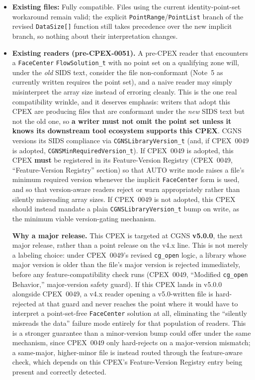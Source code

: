 \documentclass[11pt,letterpaper]{article}
\begin{document}
\begin{itemize}[leftmargin=2em]
\item \textbf{Existing files:} Fully compatible. Files using the current
  identity-point-set workaround remain valid; the explicit
  \texttt{PointRange}/\texttt{PointList} branch of the revised
  \texttt{DataSize[]} function still takes precedence over the new
  implicit branch, so nothing about their interpretation changes.

\item \textbf{Existing readers (pre-CPEX-0051).} A pre-CPEX reader that
  encounters a \texttt{FaceCenter} \texttt{FlowSolution\_t} with no point
  set on a qualifying zone will, under the \emph{old} SIDS text,
  consider the file non-conformant (Note~5 as currently written requires
  the point set), and a naive reader may simply misinterpret the array
  size instead of erroring cleanly. This is the one real compatibility
  wrinkle, and it deserves emphasis: writers that adopt this CPEX are
  producing files that are conformant under the \emph{new} SIDS text but
  not the old one, so \textbf{a writer must not omit the point set
  unless it knows its downstream tool ecosystem supports this CPEX}.
  CGNS versions its SIDS compliance via \texttt{CGNSLibraryVersion\_t}
  (and, if CPEX~0049 is adopted, \texttt{CGNSMinRequiredVersion\_t}).
  If CPEX~0049 is adopted, this CPEX \textbf{must} be registered in its
  Feature-Version Registry (CPEX~0049, ``Feature-Version Registry''
  section) so that AUTO write mode raises a file's minimum required
  version whenever
  the implicit \texttt{FaceCenter} form is used, and so that
  version-aware readers reject or warn appropriately rather than
  silently misreading array sizes. If CPEX~0049 is not adopted, this
  CPEX should instead mandate a plain \texttt{CGNSLibraryVersion\_t}
  bump on write, as the minimum viable version-gating mechanism.

  \textbf{Why a major release.} This CPEX is targeted at CGNS
  \textbf{v5.0.0}, the next major release, rather than a point release
  on the v4.x line. This is not merely a labeling choice: under
  CPEX~0049's revised \texttt{cg\_open} logic, a library whose major
  version is older than the file's major version is rejected
  immediately, before any feature-compatibility check runs (CPEX~0049,
  ``Modified \texttt{cg\_open} Behavior,'' major-version safety guard).
  If this CPEX lands in v5.0.0 alongside CPEX~0049, a v4.x reader
  opening a v5.0-written file is hard-rejected at that guard and never
  reaches the point where it would have to interpret a point-set-free
  \texttt{FaceCenter} solution at all, eliminating the ``silently
  misreads the data'' failure mode entirely for that population of
  readers. This is a stronger guarantee than a minor-version bump could
  offer under the same mechanism, since CPEX~0049 only hard-rejects on
  a major-version mismatch; a same-major, higher-minor file is instead
  routed through the feature-aware check, which depends on this CPEX's
  Feature-Version Registry entry being present and correctly detected.


\end{itemize}
\end{document}
